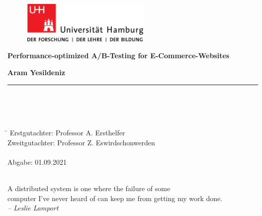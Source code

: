 \begin{titlepage}

  \setcounter{page}{-1}

	\begin{figure}[h]
		\begin{minipage}[b]{62mm}
			\includegraphics[width=62mm]{images/unilogo}
		\end{minipage}
		\hspace{4cm}
	\end{figure}

	\vfill
	
	\begin{center}
		\vspace{14mm}
		\noindent \textbf{\huge
		Performance-optimized A/B-Testing for E-Commerce-Websites
		}
		\vspace{60mm}	
	\end{center}
	
	\vfill
	
	\noindent \textbf{Aram Yesildeniz} \\
	\noindent \rule{\textwidth}{0.4mm} 
	 \\
	 \\
	 \\
	\begin{tabbing}
	\hspace{8em} \=  \kill
	Erstgutachter: \> Professor A. Ersthelfer \\
	Zweitgutachter: \> Professor Z. Eswirdschonwerden \\
	~ \\
	Abgabe: 01.09.2021
	\end{tabbing}
	
	\newpage 
	\thispagestyle{empty}
	\setcounter{page}{0}

	~\\ \vfill \noindent 
	A distributed system is one where the failure of some \\
	computer I've never heard of can keep me from getting my work done. \\
	\textit{-- Leslie Lamport}
\end{titlepage}

